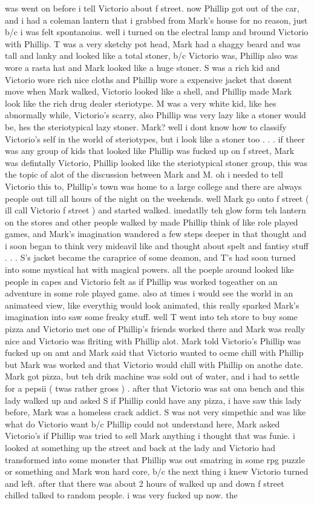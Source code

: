 \documentclass[12pt]{book}
\begin{document}
was went on before i tell Victorio about f street. now Phillip got out of the car, and i had a coleman lantern that i grabbed from Mark's house for no reason, just b/c i was felt spontanoius. well i turned on the electral lamp and bround Victorio with Phillip. T was a very sketchy pot head, Mark had a shaggy beard and was tall and lanky and looked like a total stoner, b/c Victorio was, Phillip also was wore a rasta hat and Mark looked like a huge stoner. S was a rich kid and Victorio wore rich nice cloths and Phillip wore a expensive jacket that dosent move when Mark walked, Victorio looked like a shell, and Phillip made Mark look like the rich drug dealer steriotype. M was a very white kid, like hes abnormally while, Victorio's scarry, also Phillip was very lazy like a stoner would be, hes the steriotypical lazy stoner. Mark? well i dont know how to classify Victorio's self in the world of steriotypes, but i look like a stoner too . . .  if theer was any group of kids that looked like Phillip was fucked up on f street, Mark was defintally Victorio, Phillip looked like the steriotypical stoner group, this was the topic of alot of the discussion between Mark and M. oh i needed to tell Victorio this to, Phillip's town was home to a large college and there are always people out till all hours of the night on the weekends. well Mark go onto f street ( ill call Victorio f street ) and started walked. imedatlly teh glow form teh lantern on the stores and other people walked by made Phillip think of like role played games, and Mark's imagination wandered a few steps deeper in that thought and i soon began to think very mideavil like and thought about spelt and fantisy stuff . . .  S's jacket became the caraprice of some deamon, and T's had soon turned into some mystical hat with magical powers. all the poeple around looked like people in capes and Victorio felt as if Phillip was worked togeather on an adventure in some role played game. also at times i would see the world in an animateed view, like everythig would look animated, this really sparked Mark's imagination into saw some freaky stuff. well T went into teh store to buy some pizza and Victorio met one of Phillip's friends worked there and Mark was really nice and Victorio was flriting with Phillip alot. Mark told Victorio's Phillip was fucked up on amt and Mark said that Victorio wanted to ocme chill with Phillip but Mark was worked and that Victorio would chill with Phillip on anothe date. Mark got pizza, but teh drik machine was sold out of water, and i had to settle for a pepsii ( twas rather gross ) . after that Victorio was sat ona bench and this lady walked up and asked S if Phillip could have any pizza, i have saw this lady before, Mark was a homeless crack addict. S was not very simpethic and was like what do Victorio want b/c Phillip could not understand here, Mark asked Victorio's if Phillip was tried to sell Mark anything i thought that was funie. i looked at something up the street and back at the lady and Victorio had transformed into some monster that Phillip was out smatring in some rpg puzzle or something and Mark won hard core, b/c the next thing i knew Victorio turned and left. after that there was about 2 hours of walked up and down f street chilled talked to random people. i was very fucked up now. the 
\end{document}

